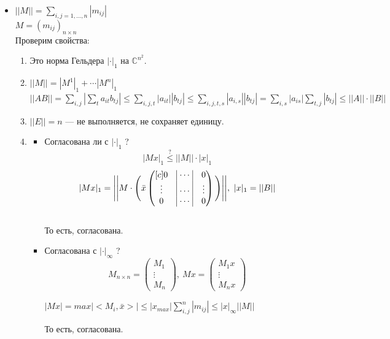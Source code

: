 \documentclass[12pt]{article}
\theoremstyle{definition}
\numberwithin{equation}{section}
\begin{document}
	\begin{itemize}
		\item \textbf{$||M||=\sum\limits_{i, j=1,...,n}|m_{ij}|$}\\
		$M=(m_{ij})_{n\times n}$\\
		Проверим свойства:\begin{enumerate}[start=0]
			\item Это норма Гельдера $|\cdot |_1$ на $\mathbb{C}^{n^2}$.
			\item $||M||=|M^1|_1+\cdots|M^n|_1$\\
			$||AB||=\sum\limits_{i,j}|\sum\limits_t a_{it}b_{tj}|\leqslant \sum\limits_{i,j,t}|a_{it}||b_{tj}|\leqslant \sum\limits_{i,j,t,s}|a_{i,s}||b_{tj}|=\sum\limits_{i,s}|a_{is}|\sum\limits_{t, j}|b_{tj}|\leqslant||A||\cdot||B||$
			\item $||E||=n$ --- не выполняется, не сохраняет единицу.\\
			\item \begin{itemize}
				\item Согласована ли с $|\cdot|_1$ ?\\
				$$|Mx|_1 \overset{?}{\leqslant} ||M||\cdot |x|_1$$
				\[|Mx|_1 = \Bigg | \Bigg | M\cdot \Bigg( \bar x \begin{pmatrix}[c]
				0 & \vline~ \cdots~ \vline& 0\\ 
				\vdots & \vline~ \cdots ~\vline& \vdots\\
				0 & \vline~ \cdots ~\vline& 0
				\end{pmatrix}\Bigg) \Bigg | \Bigg |, ~ |x|_1 = ||B||\]\\
				То есть, согласована.
				\item Согласована с $|\cdot|_\infty$ ? 
				\[M_{n \times n} = \begin{pmatrix}
				M_1\\
				\vdots\\
				M_n
				\end{pmatrix}, ~Mx=\begin{pmatrix}
				M_1x\\
				\vdots\\
				M_nx
				\end{pmatrix}\]\begin{center}
					$|Mx|=max|<M_i, \bar x>| \leqslant |x_{max}|\sum\limits_{i,j}^n|m_{ij}|\leqslant |x|_{\infty}||M||$\end{center}
				То есть, согласована.
			\end{itemize}
		\end{enumerate}

\end{itemize}
\end{document}
